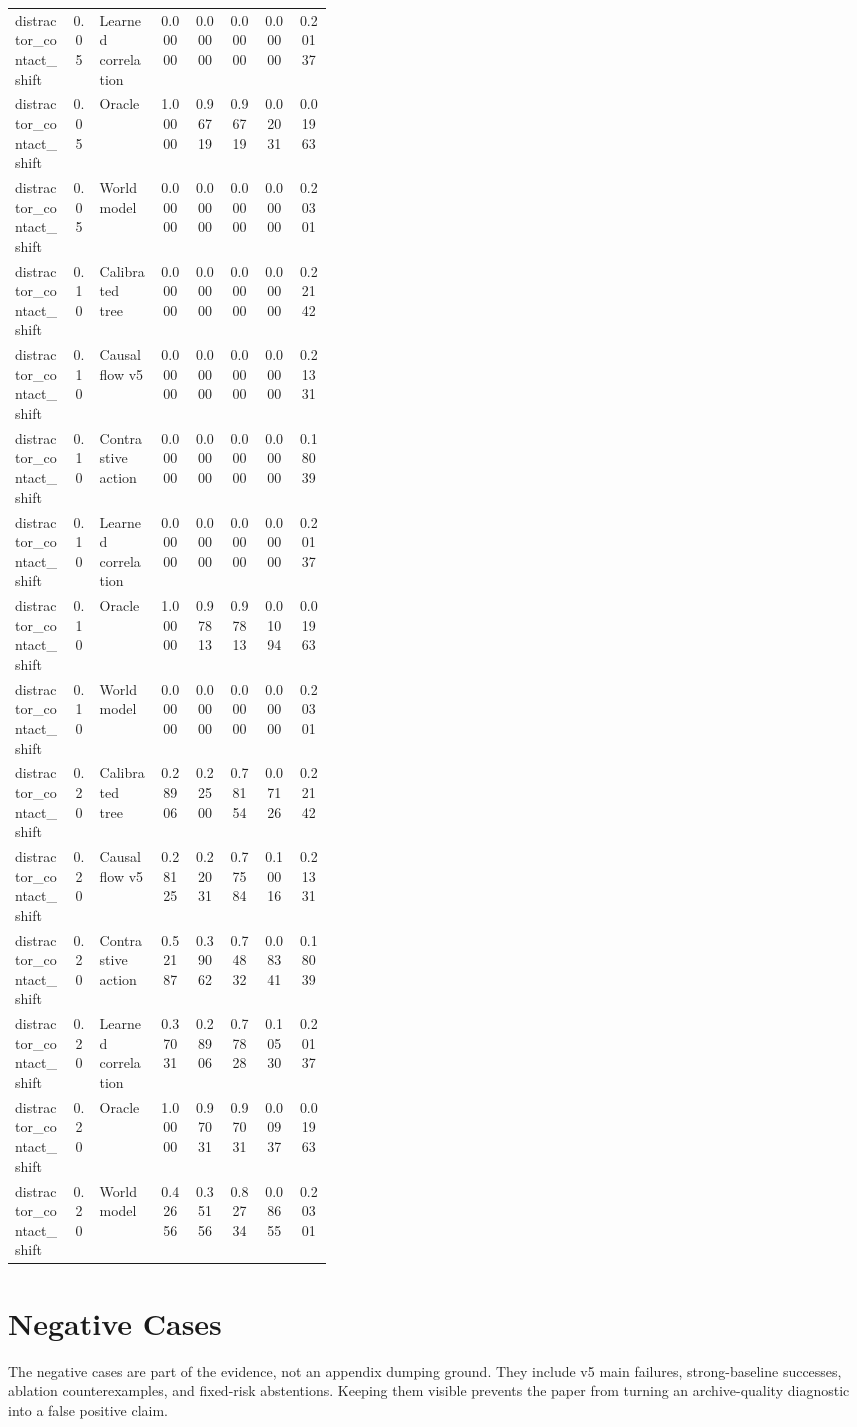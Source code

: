 \documentclass{article}
\begin{document}
\begin{center}
\begin{longtable}{p{0.18\linewidth}cp{0.19\linewidth}ccccc}
distractor\_contact\_shift & 0.05 & Learned correlation & 0.00000 & 0.00000 & 0.00000 & 0.00000 & 0.20137\\
distractor\_contact\_shift & 0.05 & Oracle & 1.00000 & 0.96719 & 0.96719 & 0.02031 & 0.01963\\
distractor\_contact\_shift & 0.05 & World model & 0.00000 & 0.00000 & 0.00000 & 0.00000 & 0.20301\\
distractor\_contact\_shift & 0.10 & Calibrated tree & 0.00000 & 0.00000 & 0.00000 & 0.00000 & 0.22142\\
distractor\_contact\_shift & 0.10 & Causal flow v5 & 0.00000 & 0.00000 & 0.00000 & 0.00000 & 0.21331\\
distractor\_contact\_shift & 0.10 & Contrastive action & 0.00000 & 0.00000 & 0.00000 & 0.00000 & 0.18039\\
distractor\_contact\_shift & 0.10 & Learned correlation & 0.00000 & 0.00000 & 0.00000 & 0.00000 & 0.20137\\
distractor\_contact\_shift & 0.10 & Oracle & 1.00000 & 0.97813 & 0.97813 & 0.01094 & 0.01963\\
distractor\_contact\_shift & 0.10 & World model & 0.00000 & 0.00000 & 0.00000 & 0.00000 & 0.20301\\
distractor\_contact\_shift & 0.20 & Calibrated tree & 0.28906 & 0.22500 & 0.78154 & 0.07126 & 0.22142\\
distractor\_contact\_shift & 0.20 & Causal flow v5 & 0.28125 & 0.22031 & 0.77584 & 0.10016 & 0.21331\\
distractor\_contact\_shift & 0.20 & Contrastive action & 0.52187 & 0.39062 & 0.74832 & 0.08341 & 0.18039\\
distractor\_contact\_shift & 0.20 & Learned correlation & 0.37031 & 0.28906 & 0.77828 & 0.10530 & 0.20137\\
distractor\_contact\_shift & 0.20 & Oracle & 1.00000 & 0.97031 & 0.97031 & 0.00937 & 0.01963\\
distractor\_contact\_shift & 0.20 & World model & 0.42656 & 0.35156 & 0.82734 & 0.08655 & 0.20301\\
\bottomrule
\end{longtable}
\normalsize
\end{center}

\section{Negative Cases}

The negative cases are part of the evidence, not an appendix dumping ground. They include v5 main failures, strong-baseline successes, ablation counterexamples, and fixed-risk abstentions. Keeping them visible prevents the paper from turning an archive-quality diagnostic into a false positive claim.
\end{document}
